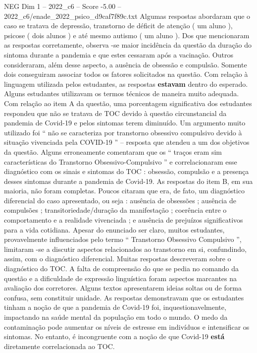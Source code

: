 \begin{textsample}{NEG Dim 1 – 2022\_c6 – Score -5.00 – 2022\_c6/enade\_2022\_psico\_d9caf7f89c.txt}
Algumas respostas abordaram que o caso se tratava de depressão, transtorno de déficit de atenção ( um aluno ), psicose ( dois alunos ) e até mesmo autismo ( um aluno ).
Dos que mencionaram as respostas corretamente, observa -se maior incidência da questão da duração do sintoma durante a pandemia e que estes cessaram após a vacinação.
Outros consideraram, além desse aspecto, a ausência de obsessão e compulsão.
Somente dois conseguiram associar todos os fatores solicitados na questão.
Com relação à linguagem utilizada pelos estudantes, as respostas \textbf{estavam} dentro do esperado.
Alguns estudantes utilizavam os termos técnicos de maneira muito adequada.
Com relação ao item A da questão, uma porcentagem significativa dos estudantes respondeu que não se tratava de TOC devido à questão circunstancial da pandemia de Covid-19 e pelos sintomas terem diminuído.
Um argumento muito utilizado foi “ não se caracteriza por transtorno obsessivo compulsivo devido à situação vivenciada pela COVID-19 ” – resposta que atendeu a um dos objetivos da questão.
Alguns erroneamente comentaram que os “ traços eram sim características do Transtorno Obsessivo-Compulsivo ” e correlacionaram esse diagnóstico com os sinais e sintomas do TOC : obsessão, compulsão e a presença desses sintomas durante a pandemia de Covid-19.
As respostas do item B, em sua maioria, não foram completas.
Poucos citaram que era, de fato, um diagnóstico diferencial do caso apresentado, ou seja : ausência de obsessões ; ausência de compulsões ; transitoriedade/duração da manifestação ; coerência entre o comportamento e a realidade vivenciada ; e ausência de prejuízos significativos para a vida cotidiana.
Apesar do enunciado ser claro, muitos estudantes, provavelmente influenciados pelo termo “ Transtorno Obsessivo Compulsivo ”, limitaram -se a discutir aspectos relacionados ao transtorno em si, confundindo, assim, com o diagnóstico diferencial.
Muitas respostas descreveram sobre o diagnóstico do TOC.
A falta de compreensão do que se pedia no comando da questão e a dificuldade de expressão linguística foram aspectos marcantes na avaliação dos corretores.
Alguns textos apresentarem ideias soltas ou de forma confusa, sem constituir unidade.
As respostas demonstravam que os estudantes tinham a noção de que a pandemia de Covid-19 foi, inquestionavelmente, impactando na saúde mental da população em todo o mundo.
O medo da contaminação pode aumentar os níveis de estresse em indivíduos e intensificar os sintomas.
No entanto, é incongruente com a noção de que Covid-19 \textbf{está} diretamente correlacionada ao TOC.

\end{textsample}
